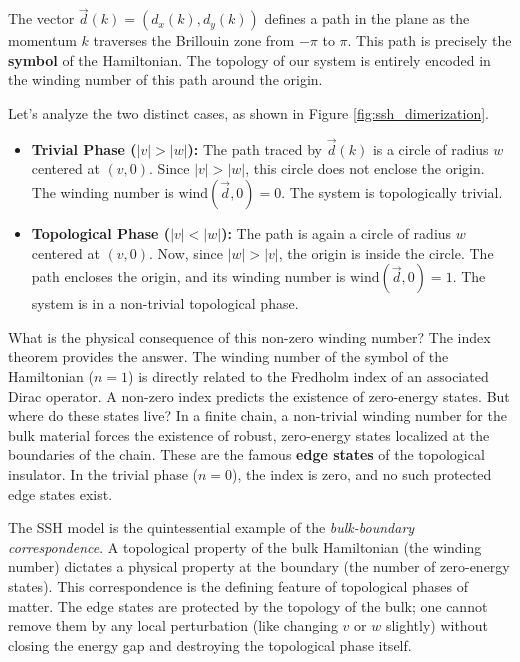 The vector $\vec{d}(k) = (d_x(k), d_y(k))$ defines a path in the plane as the momentum $k$ traverses the Brillouin zone from $-\pi$ to $\pi$.
This path is precisely the \textbf{symbol} of the Hamiltonian.
The topology of our system is entirely encoded in the winding number of this path around the origin.

Let's analyze the two distinct cases, as shown in Figure \ref{fig:ssh_dimerization}.
\begin{itemize}
    \item \textbf{Trivial Phase ($|v| > |w|$):} The path traced by $\vec{d}(k)$ is a circle of radius $w$ centered at $(v, 0)$. Since $|v|>|w|$, this circle does not enclose the origin. The winding number is $\text{wind}(\vec{d}, 0) = 0$. The system is topologically trivial.
    \item \textbf{Topological Phase ($|v| < |w|$):} The path is again a circle of radius $w$ centered at $(v,0)$. Now, since $|w|>|v|$, the origin is inside the circle. The path encloses the origin, and its winding number is $\text{wind}(\vec{d}, 0) = 1$. The system is in a non-trivial topological phase.
\end{itemize}

What is the physical consequence of this non-zero winding number?
The index theorem provides the answer.
The winding number of the symbol of the Hamiltonian ($n=1$) is directly related to the Fredholm index of an associated Dirac operator.
A non-zero index predicts the existence of zero-energy states.
But where do these states live?
In a finite chain, a non-trivial winding number for the bulk material forces the existence of robust, zero-energy states localized at the boundaries of the chain.
These are the famous \textbf{edge states} of the topological insulator.
In the trivial phase ($n=0$), the index is zero, and no such protected edge states exist.

The SSH model is the quintessential example of the \textit{bulk-boundary correspondence}.
A topological property of the bulk Hamiltonian (the winding number) dictates a physical property at the boundary (the number of zero-energy states).
This correspondence is the defining feature of topological phases of matter.
The edge states are protected by the topology of the bulk; one cannot remove them by any local perturbation (like changing $v$ or $w$ slightly) without closing the energy gap and destroying the topological phase itself.

